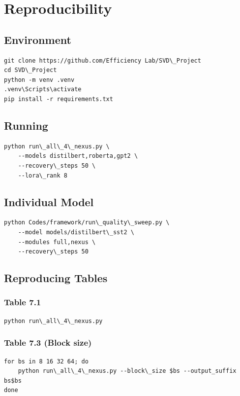 \section{Reproducibility}

\subsection{Environment}

\begin{lstlisting}
git clone https://github.com/Efficiency Lab/SVD\_Project
cd SVD\_Project
python -m venv .venv
.venv\Scripts\activate
pip install -r requirements.txt
\end{lstlisting}

\subsection{Running}

\begin{lstlisting}
python run\_all\_4\_nexus.py \
    --models distilbert,roberta,gpt2 \
    --recovery\_steps 50 \
    --lora\_rank 8
\end{lstlisting}

\subsection{Individual Model}

\begin{lstlisting}
python Codes/framework/run\_quality\_sweep.py \
    --model models/distilbert\_sst2 \
    --modules full,nexus \
    --recovery\_steps 50
\end{lstlisting}

\subsection{Reproducing Tables}

\subsubsection{Table 7.1}
\begin{lstlisting}
python run\_all\_4\_nexus.py
\end{lstlisting}

\subsubsection{Table 7.3 (Block size)}
\begin{lstlisting}
for bs in 8 16 32 64; do
    python run\_all\_4\_nexus.py --block\_size $bs --output_suffix bs$bs
done
\end{lstlisting}

